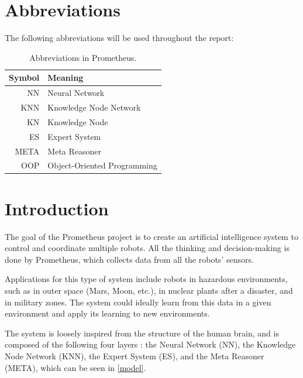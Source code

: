 \documentclass[titlepage,11pt]{article}
\begin{document}
\clearpage
\tableofcontents

\listoffigures
\listoftables
\lstlistoflistings
\clearpage

\twocolumn

\section*{Abbreviations}

The following abbreviations will be used throughout the report:

\begin{table}[!htb]
	\centering
	\caption{Abbreviations in Prometheus.}
	\begin{tabular}{r | l}
		\textbf{Symbol} & \textbf{Meaning} \\ \hline
		NN & Neural Network \\
		KNN & Knowledge Node Network \\
		KN & Knowledge Node \\
		ES & Expert System \\
		META & Meta Reasoner \\
		OOP & Object-Oriented Programming
	\end{tabular}
	\label{table:abbrevations}
\end{table}

\section{Introduction} \label{sec:intro}

The goal of the Prometheus project is to create an artificial intelligence system to control and coordinate multiple robots. All the thinking and decision-making is done by Prometheus, which collects data from all the robots' sensors.

Applications for this type of system include robots in hazardous environments, such as in outer space (Mars, Moon, etc.), in nuclear plants after a disaster, and in military zones.  The system could ideally learn from this data in a given environment and apply its learning to new environments.

The system is loosely inspired from the structure of the human brain, and is composed of the following four layers \cite{vybihal-model}: the Neural Network (NN), the Knowledge Node Network (KNN), the Expert System (ES), and the Meta Reasoner (META), which can be seen in \autoref{model}.
\end{document}
